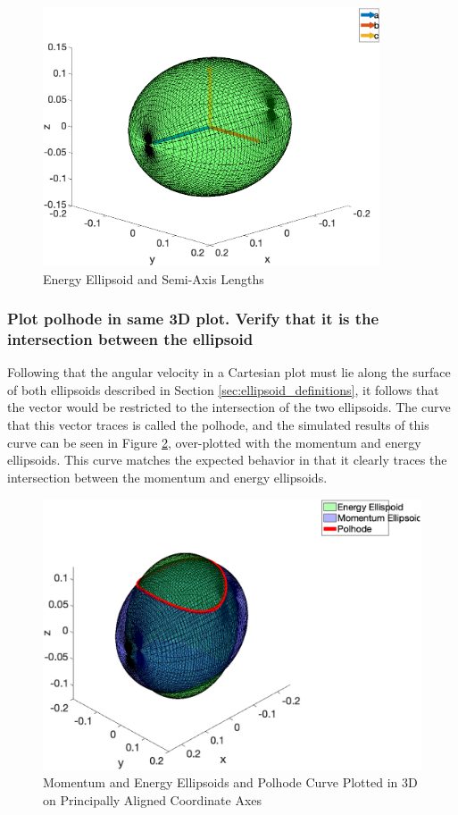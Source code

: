 \begin{figure}[H]
    \centering
    \includegraphics[width = 10cm]{Images/energy_axes_random.png}
    \caption{Energy Ellipsoid and Semi-Axis Lengths}
    \label{fig:energy_axis_verification}
\end{figure}

\subsubsection{Plot polhode in same 3D plot. Verify that it is the intersection between the ellipsoid}

Following that the angular velocity in a Cartesian plot must lie along the surface of both ellipsoids described in Section \ref{sec:ellipsoid_definitions}, it follows that the vector would be restricted to the intersection of the two ellipsoids. The curve that this vector traces is called the polhode, and the simulated results of this curve can be seen in Figure \ref{fig:ellipsoid_super_plot}, over-plotted with the momentum and energy ellipsoids. This curve matches the expected behavior in that it clearly traces the intersection between the momentum and energy ellipsoids. 

\begin{figure}[H]
    \centering
    \captionsetup{justification = centering}
    \includegraphics[width = 12cm] {Images/ellipsoid_polhode_random.png}
    \caption{Momentum and Energy Ellipsoids and Polhode Curve Plotted in 3D on Principally Aligned Coordinate Axes}
    \label{fig:ellipsoid_super_plot}
\end{figure}

